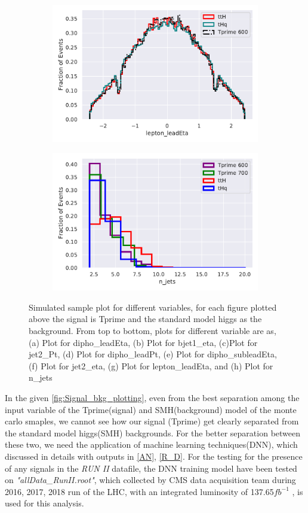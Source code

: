 \begin{figure}[H]
\begin{subfigure}{.5\textwidth}
  \centering
  \includegraphics[width=.8\linewidth]{Figure_2/lepton_leadEta.pdf}  
  \label{fig:sub-third}
\end{subfigure}
\begin{subfigure}{.5\textwidth}
  \centering
  \includegraphics[width=.8\linewidth]{Figure_2/n_jets.pdf}  
  \label{fig:sub-fourth}
\end{subfigure}
\caption{Simulated sample plot for different variables, for each figure plotted above the signal is Tprime and the standard model higgs as the background. From top to bottom, plots for different variable are as, (a) Plot for dipho\_leadEta, (b) Plot for bjet1\_eta, (c)Plot for jet2\_Pt, (d) Plot for dipho\_leadPt, (e) Plot for dipho\_subleadEta, (f) Plot for jet2\_eta, (g) Plot for lepton\_leadEta, and (h) Plot for n\_jets  }
\label{fig:Signal_bkg_plotting}
\end{figure}
 
In the given \autoref{fig:Signal_bkg_plotting}, even from the best separation among the input variable of the Tprime(signal) and SMH(background) model of the monte carlo smaples, we cannot see how our signal (Tprime) get clearly separated from the standard model higgs(SMH) backgrounds. 
For the better separation between these two, we need the application of machine learning techniques(DNN), which discussed in details with outputs in \autoref{AN}, \autoref{R_D}.
For the testing for the presence of any signals in the \textit{RUN II} datafile,  the DNN training model have been tested on \textit{"allData\_RunII.root"}, which collected by CMS data acquisition team during 2016, 2017, 2018 run of the LHC, with an integrated
luminosity of 137.65$fb^{-1}$ , is used for this analysis.




